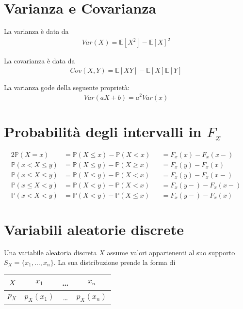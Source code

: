 \documentclass{article}
\begin{document}
\section{Varianza e Covarianza}

La varianza \`e data da
\begin{align*}
Var(X) = \mathbb{E}[X^2] - \mathbb{E}[X]^2
\end{align*}

La covarianza \`e data da
\begin{align*}
Cov(X, Y) = \mathbb{E}[XY] - \mathbb{E}[X]\mathbb{E}[Y]
\end{align*}

La varianza gode della seguente propriet\`a:
\begin{align*}
Var(aX+b) = a^2 Var(x)
\end{align*}

\section{Probabilit\`a degli intervalli in $F_x$}

\begin{alignat*}{2}
\mathbb{P}(X = x) &= \mathbb{P}(X \leq x) - \mathbb{P}(X < x) &&= F_x(x) - F_x(x-) \\
\mathbb{P}(x < X \leq y) &= \mathbb{P}(X \leq y) - \mathbb{P}(X \geq x) &&= F_x(y) - F_x(x) \\
\mathbb{P}(x \leq X \leq y) &= \mathbb{P}(X \leq y) - \mathbb{P}(X < x) &&= F_x(y) - F_x(x-) \\
\mathbb{P}(x \leq X < y) &= \mathbb{P}(X < y) - \mathbb{P}(X < x) &&= F_x(y-) - F_x(x-) \\
\mathbb{P}(x < X < y) &= \mathbb{P}(X < y) - \mathbb{P}(X \leq x) &&= F_x(y-) - F_x(x)
\end{alignat*}

\section{Variabili aleatorie discrete}

Una variabile aleatoria discreta $X$ assume valori appartenenti al suo supporto $S_X = \{x_1, \ldots, x_n\}$.
La sua distribuzione prende la forma di
\begin{center}
\begin{tabular}{ c|c|c|c } 
 $X$ & $x_1$ & \ldots & $x_n$ \\ 
 \hline
 $p_X$ & $p_X(x_1)$ & \ldots & $p_X(x_n)$
\end{tabular}
\end{center}
\end{document}

